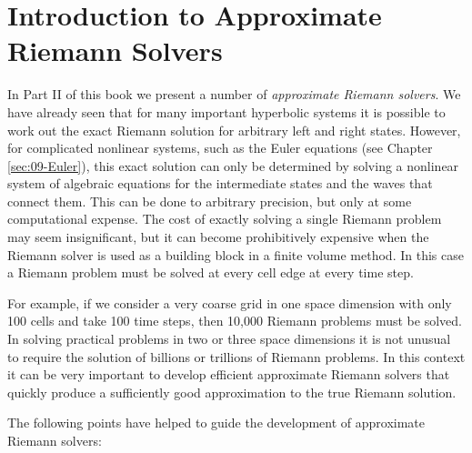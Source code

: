 \documentclass{SIAMbook2016}
\begin{document}
\hypertarget{introduction-to-approximate-riemann-solvers}{%
\chapter{Introduction to Approximate Riemann
Solvers}\label{introduction-to-approximate-riemann-solvers}}
\label{sec:10-Approximate_solvers}
In Part II of this book we present a number of \emph{approximate Riemann
solvers}. We have already seen that for many important hyperbolic
systems it is possible to work out the exact Riemann solution for
arbitrary left and right states. However, for complicated nonlinear
systems, such as the Euler equations (see Chapter \ref{sec:09-Euler}),
this exact solution can only be determined by solving a nonlinear system
of algebraic equations for the intermediate states and the waves that
connect them. This can be done to arbitrary precision, but only at some
computational expense. The cost of exactly solving a single Riemann
problem may seem insignificant, but it can become prohibitively
expensive when the Riemann solver is used as a building block in a
finite volume method. In this case a Riemann problem must be solved at
every cell edge at every time step.

For example, if we consider a very coarse grid in one space dimension
with only 100 cells and take 100 time steps, then 10,000 Riemann
problems must be solved. In solving practical problems in two or three
space dimensions it is not unusual to require the solution of billions
or trillions of Riemann problems. In this context it can be very
important to develop efficient approximate Riemann solvers that quickly
produce a sufficiently good approximation to the true Riemann solution.

The following points have helped to guide the development of approximate
Riemann solvers:
\end{document}

